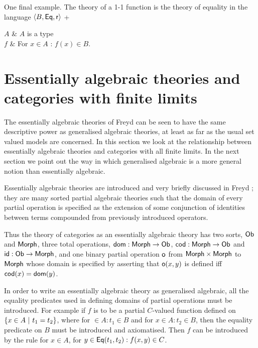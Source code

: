 One final example.
%
The theory of a 1-1 function is the theory of equality in the language $\langle B,\mathsf{Eq},\mathsf{r} \rangle$ +

\begin{theoryspec}
  $A$ & $A$ is a type \\
  $f$ & For $x \in A$ : $f(x) \in B$. \\
  \axioms
\end{theoryspec}

\section{Essentially algebraic theories and categories with finite limits} \label{sec:source-1-4}

The essentially algebraic theories of Freyd \cite{freyd:5} can be seen to have the same descriptive power as generalised algebraic theories, at least as far as the usual set valued models are concerned.
%
In this section we look at the relationship between essentially algebraic theories and categories with all finite limits.
%
In the next section we point out the way in which generalised algebraic is a more general notion than essentially algebraic.

Essentially algebraic theories are introduced and very briefly discussed in Freyd \cite{freyd:5}; they are many sorted partial algebraic theories such that the domain of every partial operation is specified as the extension of some conjunction of identities between terms compounded from previously introduced operators.

Thus the theory of categories as an essentially algebraic theory has two sorts, $\mathsf{Ob}$ and $\mathsf{Morph}$,  three total operations, $\mathsf{dom} : \mathsf{Morph} \to \mathsf{Ob}$, $\mathsf{cod} : \mathsf{Morph} \to \mathsf{Ob}$ and $\mathsf{id} : \mathsf{Ob} \to \mathsf{Morph}$, and one binary partial operation $\mathsf{o}$ from $\mathsf{Morph} \times \mathsf{Morph}$ to $\mathsf{Morph}$ whose domain is specified by asserting that $\mathsf{o}(x,y)$ is defined iff $\mathsf{cod}(x) = \mathsf{dom}(y)$.

In order to write an essentially algebraic theory as generalised algebraic, all the equality predicates used in defining domains of partial operations must be introduced.
%
For example if $f$ is to be a partial $C$-valued function defined on $\{ x \in A \ |\  t_1 = t_2 \}$, where for $ \in A : t_1 \in B$ and for $x \in A : t_2 \in B$, then the equality predicate on $B$ must be introduced and axiomatised.
%
Then $f$ can be introduced by the rule for $x \in A$, for $y \in \mathsf{Eq}(t_1,t_2) : f(x,y) \in C$.

